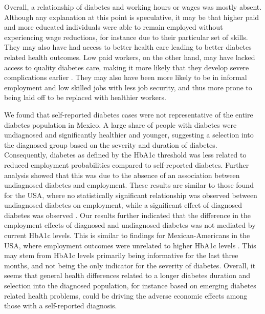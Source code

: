 \documentclass[12pt,english]{article}
\begin{document}
Overall, a relationship of diabetes and working hours or wages was mostly absent. Although any explanation at this point is speculative, it may be that higher paid and more educated individuals were able to remain employed without experiencing wage reductions, for instance due to their particular set of skills. They may also have had access to better health care leading to better diabetes related health outcomes. Low paid workers, on the other hand, may have lacked access to quality diabetes care, making it more likely that they develop severe complications earlier \parencite{Flores-Hernandez2015}. They may also have been more likely to be in informal employment and low skilled jobs with less job security, and thus more prone to being laid off to be replaced with healthier workers.

We found that self-reported diabetes cases were not representative of the entire diabetes population in Mexico. A large share of people with diabetes were undiagnosed and significantly healthier and younger, suggesting a selection into the diagnosed group based on the severity and duration of diabetes. Consequently, diabetes as defined by the \ac{HbA1c} threshold was less related to reduced employment probabilities compared to self-reported diabetes. Further analysis showed that this was due to the absence of an association between undiagnosed diabetes and employment. These results are similar to those found for the USA, where no statistically significant relationship was observed between undiagnosed diabetes on employment, while a significant effect of diagnosed diabetes was observed \parencite{Minor2015}. Our results further indicated that the  difference in the employment effects of diagnosed and undiagnosed diabetes was not mediated by current \ac{HbA1c} levels. This is similar to findings for Mexican-Americans in the USA, where employment outcomes were unrelated to higher \ac{HbA1c} levels \parencite{BrownIII2011}. This may stem from \ac{HbA1c} levels primarily being informative for the last three months, and not being the only indicator for the severity of diabetes. Overall, it seems that general health differences related to a longer diabetes duration and selection into the diagnosed population, for instance based on emerging diabetes related health problems, could be driving the adverse economic effects among those with a self-reported diagnosis.
\end{document}
